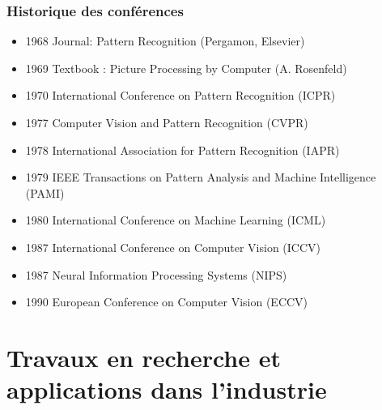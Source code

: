 \documentclass{beamer}
\begin{document}
\begin{frame}
\frametitle{Historique des conférences}

\begin{itemize}
\item 1968 Journal: Pattern Recognition (Pergamon, Elsevier)
\item 1969 Textbook : Picture Processing by Computer (A. Rosenfeld)
\item 1970 International Conference on Pattern Recognition (ICPR)
\item 1977 Computer Vision and Pattern Recognition (CVPR)
\item 1978 International Association for Pattern Recognition (IAPR)
\item 1979 IEEE Transactions on Pattern Analysis and Machine Intelligence (PAMI)
\item 1980 International Conference on Machine Learning (ICML)
\item 1987 International Conference on Computer Vision (ICCV)
\item 1987 Neural Information Processing Systems (NIPS)
\item 1990 European Conference on Computer Vision (ECCV)
\end{itemize}

\end{frame}


\section{Travaux en recherche et applications dans l'industrie}
\end{document}
